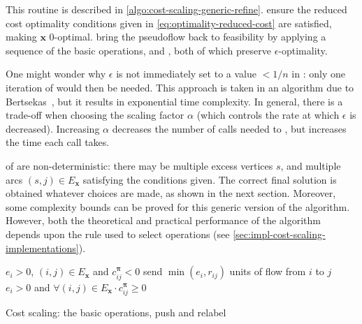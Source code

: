 This routine is described in \cref{algo:cost-scaling-generic-refine}.  ensure the reduced cost optimality conditions given in \cref{eq:optimality-reduced-cost} are satisfied, making $\mathbf{x}$ $0$-optimal.  bring the pseudoflow back to feasibility by applying a sequence of the basic operations,  and , both of which preserve $\epsilon$-optimality.

One might wonder why $\epsilon$ is not immediately set to a value $< 1/n$ in : only one iteration of  would then be needed. This approach is taken in an algorithm due to Bertsekas~\cite{Bertsekas:1985}, but it results in exponential time complexity. In general, there is a trade-off when choosing the scaling factor $\alpha$ (which controls the rate at which $\epsilon$ is decreased). Increasing $\alpha$ decreases the number of calls needed to , but increases the time each call takes\footnotemark.

 of  are non-deterministic: there may be multiple excess vertices $s$, and multiple arcs $(s,j) \in E_\mathbf{x}$ satisfying the conditions given. The correct final solution is obtained whatever choices are made, as shown in the next section. Moreover, some complexity bounds can be proved for this generic version of the algorithm. However, both the theoretical and practical performance of the algorithm depends upon the rule used to select operations (see \cref{sec:impl-cost-scaling-implementations}).

\begin{algorithm}
\begin{algorithmic}[1]
    \Require $e_i > 0$, $(i,j) \in E_{\mathbf{x}}$ and $c^{\boldsymbol{\pi}}_{ij} < 0$
        \State send $\min\left(e_i, r_{ij}\right)$ units of flow from $i$ to $j$
    \EndFunction
    \setcounter{ALG@line}{0}
    \Statex
    \Require $e_i > 0$ and $\forall(i,j) \in E_{\mathbf{x}} \cdot c^{\boldsymbol{\pi}}_{ij} \geq 0$
    \EndFunction
\end{algorithmic}
\caption{Cost scaling: the basic operations, push and relabel}
\label{algo:cost-scaling-operations}
\end{algorithm}

